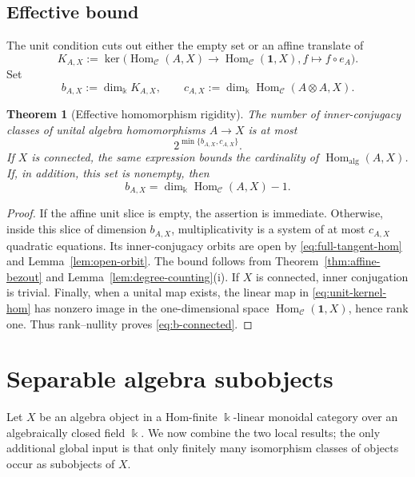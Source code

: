 \documentclass[11pt]{amsart}
\newtheorem{theorem}{Theorem}[section]
\theoremstyle{definition}
\theoremstyle{remark}
\newcommand{\C}{\mathcal C}
\newcommand{\one}{\mathbf 1}
\newcommand{\kk}{\Bbbk}
\DeclareMathOperator{\Hom}{Hom}
\begin{document}
\subsection*{Effective bound}

The unit condition cuts out either the empty set or an affine translate of
\begin{equation}\label{eq:unit-kernel-hom}
 K_{A,X}:=\ker\bigl(\Hom_{\C}(A,X)\longrightarrow\Hom_{\C}(\one,X),
 f\longmapsto f\circ e_A\bigr).
\end{equation}
Set
\begin{equation}\label{eq:hom-data}
 b_{A,X}:=\dim_{\kk}K_{A,X},
 \qquad
 c_{A,X}:=\dim_{\kk}\Hom_{\C}(A\otimes A,X).
\end{equation}

\begin{theorem}[Effective homomorphism rigidity]\label{thm:hom-bound}
The number of inner-conjugacy classes of unital algebra homomorphisms
$A\to X$ is at most
\begin{equation}\label{eq:hom-bound}
 2^{\min\{b_{A,X},c_{A,X}\}}.
\end{equation}
If $X$ is connected, the same expression bounds the cardinality of
$\Hom_{\mathrm{alg}}(A,X)$.  If, in addition, this set is nonempty, then
\begin{equation}\label{eq:b-connected}
 b_{A,X}=\dim_{\kk}\Hom_{\C}(A,X)-1.
\end{equation}
\end{theorem}

\begin{proof}
If the affine unit slice is empty, the assertion is immediate.
Otherwise, inside this slice of dimension $b_{A,X}$, multiplicativity is a
system of at most $c_{A,X}$ quadratic equations.  Its inner-conjugacy orbits
are open by \eqref{eq:full-tangent-hom} and
Lemma~\ref{lem:open-orbit}.  The bound follows from
Theorem~\ref{thm:affine-bezout} and
Lemma~\ref{lem:degree-counting}\textup{(i)}.  If $X$ is connected, inner
conjugation is trivial.  Finally, when a unital map exists, the linear map in
\eqref{eq:unit-kernel-hom} has nonzero image in the one-dimensional space
$\Hom_{\C}(\one,X)$, hence rank one.  Thus rank--nullity proves
\eqref{eq:b-connected}.
\end{proof}
\section{Separable algebra subobjects}\label{sec:subobjects}

Let $X$ be an algebra object in a Hom-finite $\kk$-linear monoidal category
over an algebraically closed field $\kk$.  We now combine the two local
results; the only additional global input is that only finitely many
isomorphism classes of objects occur as subobjects of $X$.
\end{document}
